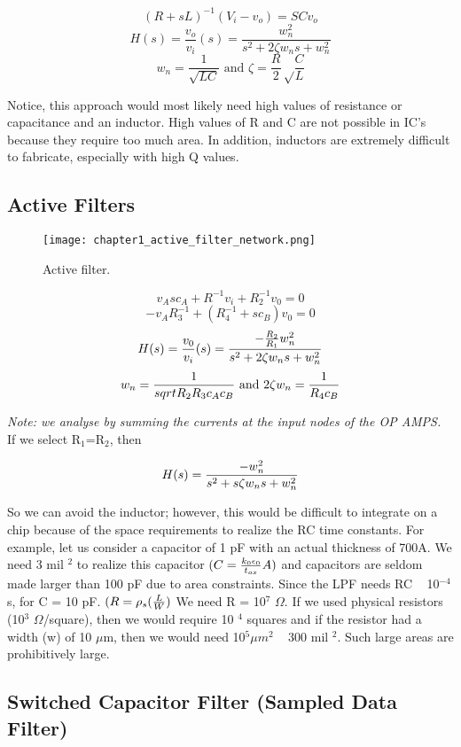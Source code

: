 \documentclass[11pt,fleqn]{book} %
\begin{document}
$$(R+sL)^{-1}(V_i-v_o)=SCv_o $$
$$H(s)=\frac{v_o}{v_i}(s)=\frac{w_n^2}{s^2+2\zeta w_ns+w_n^2} $$
$$w_n=\frac{1}{\sqrt{LC}} \text{ and } \zeta=\frac{R}{2}\sqrt\frac{C}{L}$$

Notice, this approach would most likely need high values of resistance or capacitance and an inductor. High values of R and C are not possible in IC's because they require too much area. In addition, inductors are extremely difficult to fabricate, especially with high Q values.

\subsection{Active Filters}

\begin{figure}[h]
  \centering\texttt{[image: chapter1\_active\_filter\_network.png]}
  \caption{Active filter.}
\end{figure}

$$v_Asc_A+R^{-1}v_i+R_2^{-1}v_0=0$$
$$-v_AR_3^{-1}+(R_4^{-1}+sc_B)v_0=0$$
$$H(s)={v_0\over v_i}(s)={-{R_2\over R_1}w_n^2\over s^2+2\zeta w_ns+w_n^2}$$
$$w_n={1\over sqrt{R_2R_3c_Ac_B}} \text{ and } 2\zeta w_n={1\over R_4c_B}$$

\textit{Note: we analyse by summing the currents at the input nodes of the OP AMPS.} \\

If we select R$_1$=R$_2$, then

$$H(s)={-w_n^2\over s^2+s\zeta w_ns+w_n^2}$$

So we can avoid the inductor; however, this would be difficult to integrate on a chip because of the space requirements to realize the RC time constants. For example, let us consider a capacitor of 1 pF with an actual thickness of 700A. We need 3 mil $^2$  to realize this capacitor $(C={k_0\epsilon_0\over t_{ox}}A)$ and capacitors are seldom made larger than 100 pF due to area constraints. Since the LPF needs RC ~ 10$^{-4}$s, for C = 10 pF. $(R=\rho_s({L\over W})$ We need R = 10$^7$ $\Omega$. If we used physical resistors (10$^3$ $\Omega$/square), then we would require 10 $^4$ squares and if the resistor had a width (w) of 10 $\mu$m, then we would need 10$^5\mu m ^2$ ~ 300 mil $^2$. Such large areas are prohibitively large.

\subsection{Switched Capacitor Filter (Sampled Data Filter)}
\end{document}
